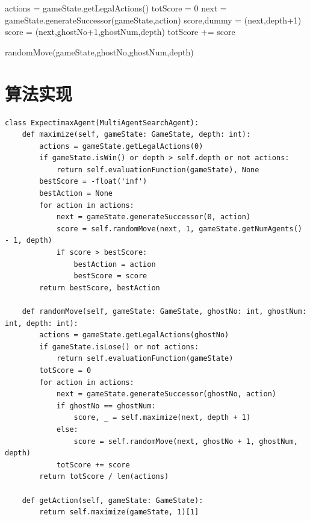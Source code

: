 \begin{procedure}[h]
    \;
    actions = gameState.getLegalActions()\;
    {}
    totScore = 0\;
    {
        next = gameState.generateSuccessor(gameState,action)\;
        {
            score,dummy = \maximize(next,depth+1)
        }
        {
        score = \randomMove(next,ghostNo+1,ghostNum,depth)
        }
        totScore += score\;
    }
    \;
    \caption{randomMove(gameState,ghostNo,ghostNum,depth)}
\end{procedure}
\section{算法实现}
\begin{lstlisting}[emph={[3]currentGameState,gameState,depth,alpha,beta,ghostNo,ghostNum},emphstyle={[3]\color{vscode_parametercolor}},emph={[4]GameState,MinimaxAgent,AlphaBetaAgent},emphstyle={[4]\color{vscode_classcolor}}]
class ExpectimaxAgent(MultiAgentSearchAgent):
    def maximize(self, gameState: GameState, depth: int):
        actions = gameState.getLegalActions(0)
        if gameState.isWin() or depth > self.depth or not actions:
            return self.evaluationFunction(gameState), None
        bestScore = -float('inf')
        bestAction = None
        for action in actions:
            next = gameState.generateSuccessor(0, action)
            score = self.randomMove(next, 1, gameState.getNumAgents() - 1, depth)
            if score > bestScore:
                bestAction = action
                bestScore = score
        return bestScore, bestAction

    def randomMove(self, gameState: GameState, ghostNo: int, ghostNum: int, depth: int):
        actions = gameState.getLegalActions(ghostNo)
        if gameState.isLose() or not actions:
            return self.evaluationFunction(gameState)
        totScore = 0
        for action in actions:
            next = gameState.generateSuccessor(ghostNo, action)
            if ghostNo == ghostNum:
                score, _ = self.maximize(next, depth + 1)
            else:
                score = self.randomMove(next, ghostNo + 1, ghostNum, depth)
            totScore += score
        return totScore / len(actions)

    def getAction(self, gameState: GameState):
        return self.maximize(gameState, 1)[1]
\end{lstlisting}
